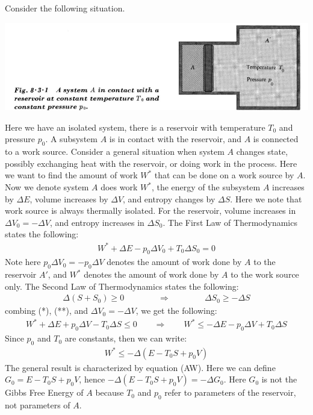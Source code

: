 \documentclass[11pt,oneside]{book}
\theoremstyle{break}
\theoremstyle{break}
\begin{document}
Consider the following situation. 
\begin{center}
\includegraphics[scale=0.5]{eqAA'.png}
\end{center}
Here we have an isolated system, there is a reservoir with temperature $T_0$ and pressure $p_0$. A subsystem $A$ is in contact with the reservoir, and $A$ is connected to a work source. Consider a general situation when system $A$ changes state, possibly exchanging heat with the reservoir, or doing work in the process. Here we want to find the amount of work $W^*$ that can be done on a work source by $A$. Now we denote system $A$ does work $W^*$, the energy of the subsystem $A$ increases by $\Delta E$, volume increases by $\Delta V$, and entropy changes by $\Delta S$. Here we note that work source is always thermally isolated. For the reservoir, volume increases in $\Delta V_0 = -\Delta V$, and entropy increases in $\Delta S_0$. The First Law of Thermodynamics states the following:
\begin{align*}
W^* + \Delta E - p_0 \Delta V_0 + T_0 \Delta S_0 = 0 \tag{*}
\end{align*}
Note here $p_0 \Delta V_0 =- p_0 \Delta V$ denotes the amount of work done by $A$ to the reservoir $A'$, and $W^*$ denotes the amount of work done by $A$ to the work source only. The Second Law of Thermodynamics states the following:
\begin{align*}
\Delta (S + S_0) \geq 0 \qquad \qquad \Rightarrow \qquad \qquad \Delta S_0 \geq - \Delta S\tag{**}
\end{align*}
combing (*), (**), and $\Delta V_0 = -\Delta V$, we get the following:
\begin{align*}
W^* + \Delta E + p_0 \Delta V - T_0 \Delta S \leq 0 \qquad \Rightarrow \qquad W^* \leq -\Delta E - p_0 \Delta V + T_0 \Delta S
\end{align*}
Since $p_0$ and $T_0$ are constants, then we can write:
\begin{align*}
W^* \leq -\Delta (E - T_0 S + p_0 V) \tag{AW}
\end{align*}
The general result is characterized by equation (AW). Here we can define $G_0 = E - T_0 S + p_0 V$, hence $-\Delta  (E - T_0 S + p_0 V)  = -\Delta G_0$. Here $G_0$ is not the Gibbs Free Energy of $A$ because $T_0$ and $p_0$ refer to parameters of the reservoir, not parameters of $A$.\\
\end{document}
